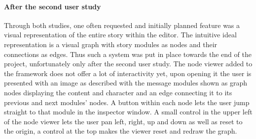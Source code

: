 \paragraph{After the second user study} Through both studies, one often requested and initially planned feature was a visual representation of the entire story within the editor. The intuitive ideal representation is a visual graph with story modules as nodes and their connections as edges. Thus such a system was put in place towards the end of the project, unfortunately only after the second user study. The node viewer added to the framework does not offer a lot of interactivity yet, upon opening it the user is presented with an image as described with the message modules shown as graph nodes displaying the content and character and an edge connecting it to its previous and next modules' nodes. A button within each node lets the user jump straight to that module in the inspector window. A small control in the upper left of the node viewer lets the user pan left, right, up and down as well as reset to the origin, a control at the top makes the viewer reset and redraw the graph.